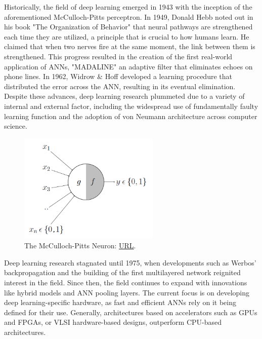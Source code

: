 Historically, the field of deep learning emerged in 1943 with the inception of the aforementioned McCulloch-Pitts perceptron. In 1949, Donald Hebb noted out in his book "The Organization of Behavior" that neural pathways are strengthened each time they are utilized, a principle that is crucial to how humans learn. He claimed that when two nerves fire at the same moment, the link between them is strengthened. This progress resulted in the creation of the first real-world application of ANNs, "MADALINE" an adaptive filter that eliminates echoes on phone lines. In 1962, Widrow \& Hoff developed a learning procedure that distributed the error across the ANN, resulting in its eventual elimination. Despite these advances, deep learning research plummeted due to a variety of internal and external factor, including the widespread use of fundamentally faulty learning function and the adoption of von Neumann architecture across computer science.

\begin{figure}[H]
    \centering
        \includegraphics[width=0.6\textwidth]{Images/ANNArchitectures/McCulloch-Pitts Neuron.png}
        \decoRule
        \caption[McCulloch-Pitts Neuron]{The McCulloch-Pitts Neuron: \href{https://towardsdatascience.com/mcculloch-pitts-model-5fdf65ac5dd1}{URL}.}
        \label{fig:McCulloch-Pitts Neuron}
\end{figure}

Deep learning research stagnated until 1975, when developments such as Werbos' backpropagation and the building of the first multilayered network reignited interest in the field. Since then, the field continues to expand with innovations like hybrid models and ANN pooling layers. The current focus is on developing deep learning-specific hardware, as fast and efficient ANNs rely on it being defined for their use. Generally, architectures based on accelerators such as GPUs and FPGAs, or VLSI hardware-based designs, outperform CPU-based architectures. \cite{dl_history}

